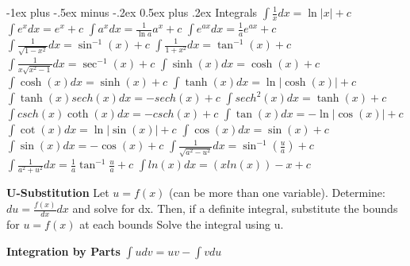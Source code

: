 \documentclass[10pt,landscape]{article}
\makeatletter
\renewcommand{\section}{\@startsection{section}{1}{0mm}%
                                {-1ex plus -.5ex minus -.2ex}%
                                {0.5ex plus .2ex}%
                                {\normalfont\large\bfseries}}
\makeatother
\begin{document}
\begin{multicols*}{5}
\section{Integrals}
\scriptsize
$\int \frac{1}{x}dx = \ln|x|+c$\newline
$\int e^x dx = e^x+c $\newline
$\int a^x dx = \frac{1}{\ln a} a^x+c $\newline
$\int e^{ax} dx = \frac{1}{a} e^{ax}+c $\newline
$\int \frac{1}{\sqrt{1-x^2}} dx = \sin^{-1}(x)+c $\newline
$\int \frac{1}{1+x^2} dx = \tan^{-1}(x)+c $\newline
$\int \frac{1}{x\sqrt{x^2-1}} dx = \sec^{-1}(x)+c $\newline
$\int \sinh(x) dx = \cosh(x)+c $\newline
$\int \cosh(x) dx = \sinh(x)+c $\newline
$\int \tanh(x) dx = \ln|\cosh(x)|+c $\newline
$\int \tanh(x)sech(x) dx = -sech(x)+c $\newline
$\int sech^2(x) dx = \tanh(x)+c $\newline
$\int csch(x)\coth(x) dx = -csch(x)+c $\newline
$\int \tan(x) dx = -\ln|\cos(x) |+c $\newline
$\int \cot(x) dx = \ln|\sin(x)|+c $\newline
$\int \cos(x) dx = \sin(x)+c $\newline
$\int \sin(x) dx = -\cos(x)+c $\newline
$\int \frac{1}{\sqrt{a^2-u^2}} dx = \sin^{-1}(\frac{u}{a})+c $\newline
$\int \frac{1}{a^2+u^2} dx = \frac{1}{a}\tan^{-1}\frac{u}{a}+c $\newline
$ \int ln(x) dx = (xln(x))-x+c $\newline

\textbf{U-Substitution}\newline
Let $ u=f(x) $ (can be more than one variable).\newline
Determine: $ du = \frac{f(x)}{dx}dx $ and solve for dx.\newline
Then, if a definite integral, substitute the bounds for $ u=f(x) $ at each bounds\newline
Solve the integral using u.\newline

\textbf{Integration by Parts}\newline
$ \int u dv = uv-\int v du $


\end{multicols*}
\end{document}
